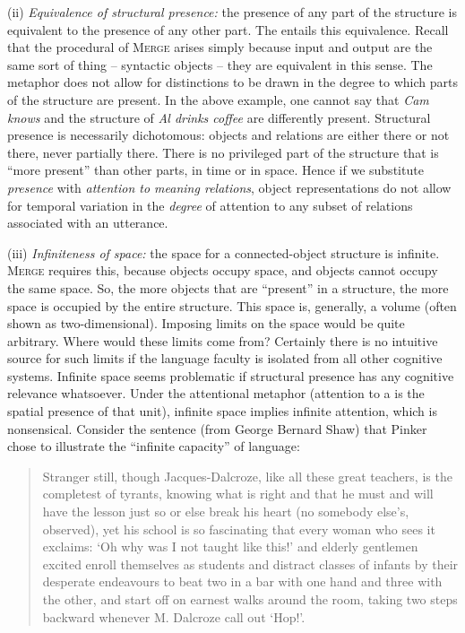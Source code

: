 (ii) \textit{Equivalence of structural presence:} the presence of any part of the structure is equivalent to the presence of any other part. The  entails this equivalence. Recall that the procedural  of \textsc{Merge} arises simply because input and output are the same sort of thing -- syntactic objects -- they are equivalent in this sense. The metaphor does not allow for distinctions to be drawn in the degree to which parts of the structure are present. In the above example, one cannot say that \textit{Cam knows} and the structure of \textit{Al drinks coffee} are differently present. Structural presence is necessarily dichotomous: objects and relations are either there or not there, never partially there. There is no privileged part of the structure that is “more present” than other parts, in time or in space. Hence if we substitute \textit{presence} with \textit{attention to meaning relations}, object representations do not allow for temporal variation in the \textit{degree} of attention to any subset of relations associated with an utterance. 

(iii) \textit{Infiniteness of space:} the space for a connected-object structure is infinite. \textsc{Merge} requires this, because objects occupy space, and objects cannot occupy the same space. So, the more objects that are “present” in a structure, the more space is occupied by the entire structure. This space is, generally, a volume (often shown as two-di\-men\-sional). Imposing limits on the space would be quite arbitrary. Where would these limits come from? Certainly there is no intuitive source for such limits if the language faculty is isolated from all other cognitive systems. Infinite space seems problematic if structural presence has any cognitive relevance whatsoever. Under the attentional metaphor (attention to a  is the spatial presence of that unit), infinite space implies infinite attention, which is nonsensical. Consider the sentence (from George Bernard Shaw) that Pinker chose to illustrate the “infinite capacity” of language:

\begin{quote}
Stranger still, though Jacques-Dalcroze, like all these great teachers, is the completest of tyrants, knowing what is right and that he must and will have the lesson just so or else break his heart (no somebody else’s, observed), yet his school is so fascinating that every woman who sees it exclaims: ‘Oh why was I not taught like this!’ and elderly gentlemen excited enroll themselves as students and distract classes of infants by their desperate endeavours to beat two in a bar with one hand and three with the other, and start off on earnest walks around the room, taking two steps backward whenever M. Dalcroze call out ‘Hop!’. \citep{Pinker2003}
\end{quote}

